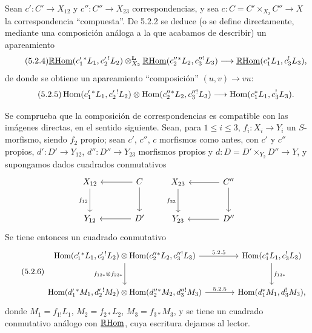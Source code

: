 Sean $c':C'\to X_{12}$ y $c'':C''\to X_{23}$ correspondencias, y sea $c:C=C'\times_{X_2}C''\to X$ la correspondencia ``compuesta''. De 5.2.2 se deduce (o se define directamente, mediante una composición análoga a la que acabamos de describir) un apareamiento
\begin{equation}
\tag{5.2.4}
\underline{\mathbb{R}\mathrm{Hom}}(c_1'{}^*L_1,c_2'{}^!L_2)\otimes_{X_2}^{\mathbf L}\underline{\mathbb{R}\mathrm{Hom}}(c_2''{}^*L_2,c_3''{}^!L_3)
\longrightarrow\underline{\mathbb{R}\mathrm{Hom}}(c_1^*L_1,c_3^!L_3),
\end{equation}
de donde se obtiene un apareamiento ``composición'' $(u,v)\longrightarrow vu$:
\begin{equation}
\tag{5.2.5}
\operatorname{Hom}(c_1'{}^*L_1,c_2'{}^!L_2)\otimes\operatorname{Hom}(c_2''{}^*L_2,c_3''{}^!L_3)
\longrightarrow\operatorname{Hom}(c_1^*L_1,c_3^!L_3).
\end{equation}

Se comprueba que la composición de correspondencias es compatible con las imágenes directas, en el sentido siguiente. Sean, para $1\leq i\leq 3$, $f_i:X_i\to Y_i$ un $S$-morfismo, siendo $f_2$ propio; sean $c'$, $c''$, $c$ morfismos como antes, con $c'$ y $c''$ propios, $d':D'\to Y_{12}$, $d'':D''\to Y_{23}$ morfismos propios y $d:D=D'\times_{Y_2}D''\to Y$, y supongamos dados cuadrados conmutativos
\[
\begin{tikzcd}[column sep=large,row sep=large]
X_{12} \arrow[d,"f_{12}"'] & C \arrow[l] \arrow[d] \\
Y_{12} & D' \arrow[l]
\end{tikzcd}
\qquad
\begin{tikzcd}[column sep=large,row sep=large]
X_{23} \arrow[d,"f_{23}"'] & C'' \arrow[l] \arrow[d] \\
Y_{23} & D'' \arrow[l]
\end{tikzcd}
\]
Se tiene entonces un cuadrado conmutativo
\begin{equation}
\tag{5.2.6}
\begin{tikzcd}[column sep=large,row sep=large]
\Hom(c_1'{}^*L_1,c_2'{}^!L_2)\otimes\Hom(c_2''{}^*L_2,c_3''{}^!L_3) \arrow[r,"5.2.5"] \arrow[d,"f_{12*}\otimes f_{23*}"']
& \Hom(c_1^*L_1,c_3^!L_3) \arrow[d,"f_{13*}"] \\
\Hom(d_1'{}^*M_1,d_2'{}^!M_2)\otimes\Hom(d_2''{}^*M_2,d_3''{}^!M_3) \arrow[r,"5.2.5"]
& \Hom(d_1^*M_1,d_3^!M_3),
\end{tikzcd}
\end{equation}
donde $M_1=f_{1!}L_1$, $M_2=f_{2*}L_2$, $M_3=f_{3*}M_3$, y se tiene un cuadrado conmutativo análogo con $\underline{\mathbb{R}\mathrm{Hom}}$, cuya escritura dejamos al lector.


